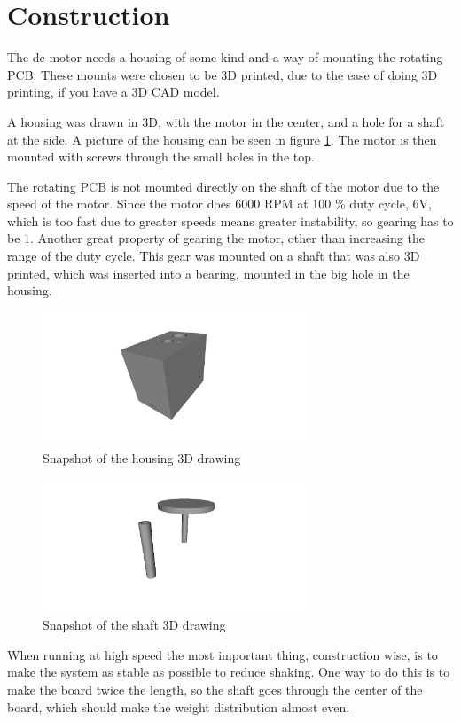 \section{Construction}
The dc-motor needs a housing of some kind and a way of mounting the rotating PCB.
These mounts were chosen to be 3D printed, due to the ease of doing 3D printing, if you have a 3D CAD model.

A housing was drawn in 3D, with the motor in the center, and a hole for a shaft at the side. 
A picture of the housing can be seen in figure \ref{fig:housing3D}.
The motor is then mounted with screws through the small holes in the top.

The rotating PCB is not mounted directly on the shaft of the motor due to the speed of the motor.
Since the motor does 6000 RPM at 100 \% duty cycle, 6V, which is too fast due to greater speeds means greater instability, so gearing has to be 1.
Another great property of gearing the motor, other than increasing the range of the duty cycle.
This gear was mounted on a shaft that was also 3D printed, which was inserted into a bearing, mounted in the big hole in the housing.

\begin{figure}[H]
 \centering
 \includegraphics[width=0.7\textwidth]{img/housing3D}
 \caption{Snapshot of the housing 3D drawing}
 \label{fig:housing3D}
\end{figure}

\begin{figure}[H]
 \centering
 \includegraphics[width=0.7\textwidth]{img/shaft_3d}
 \caption{Snapshot of the shaft 3D drawing}
 \label{fig:shaft3D}
\end{figure}

When running at high speed the most important thing, construction wise, is to make the system as stable as possible to reduce shaking.
One way to do this is to make the board twice the length, so the shaft goes through the center of the board, which should make the weight distribution almost even.